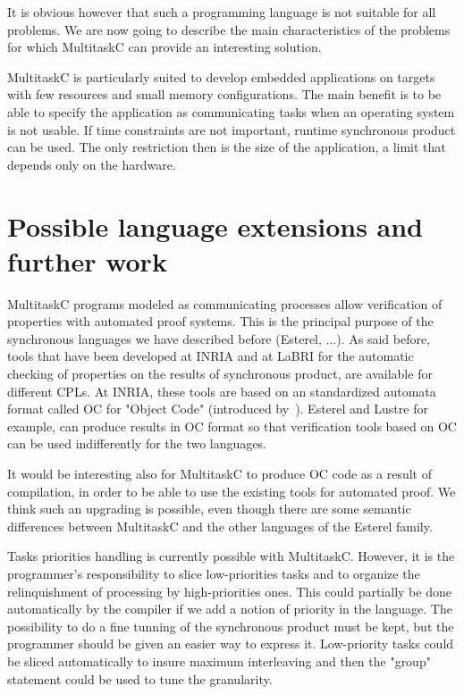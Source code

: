 \documentclass[10pt]{report}
\begin{document}
It is obvious however that such a programming language is not suitable for all problems. We are now going to describe the main 
characteristics of the problems for which MultitaskC can provide an interesting solution.

MultitaskC is particularly suited to develop embedded applications on targets with few resources and small
memory configurations. The main benefit is to be able to specify the application as communicating tasks when an operating
system is not usable. If time constraints are not important, runtime synchronous product can be used. The only restriction 
then is the size of the application, a limit that depends only on the hardware.

\section{Possible language extensions and further work}

MultitaskC programs modeled as communicating processes allow verification of properties with automated proof systems. This
is the principal purpose of the synchronous languages we have described before (Esterel, ...). As said before, 
tools that have been developed at INRIA and at LaBRI for the automatic checking of properties on the results of synchronous
product, are available for different CPLs. At INRIA, these tools are based on an standardized automata format called OC 
for "Object Code" (introduced by~\cite{Halbwachs:91}). Esterel and Lustre for example, can produce results in OC format 
so that verification tools based on OC can be used indifferently for the two languages.

It would be interesting also for MultitaskC to produce OC code as a result of compilation, in order to be able to use
the existing tools for automated proof. We think such an upgrading is possible, even though there are some semantic 
differences between MultitaskC and the other languages of the Esterel family.

Tasks priorities handling is currently possible with MultitaskC. However, it is the programmer's responsibility to slice 
low-priorities tasks and to organize the relinquishment of processing by high-priorities ones. This could partially be done 
automatically by the compiler if we add a notion of priority in the language. The possibility to do a fine tunning of the 
synchronous product must be kept, but the programmer should be given an easier way to express it. Low-priority tasks could be 
sliced automatically to insure maximum interleaving and then the "group" statement could be used to tune the granularity.
\end{document}

